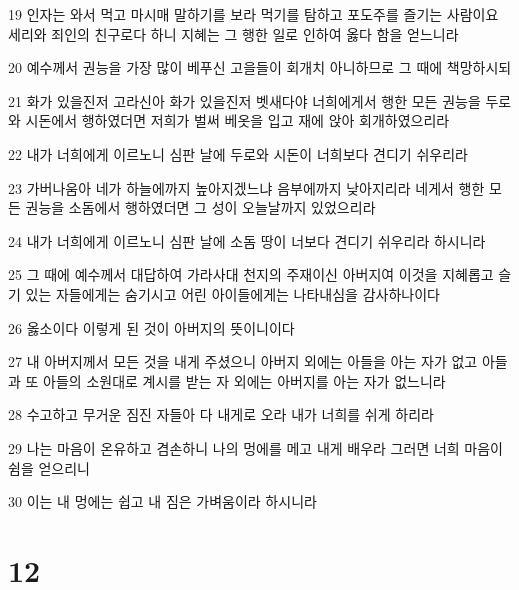 \par 19 인자는 와서 먹고 마시매 말하기를 보라 먹기를 탐하고 포도주를 즐기는 사람이요 세리와 죄인의 친구로다 하니 지혜는 그 행한 일로 인하여 옳다 함을 얻느니라
\par 20 예수께서 권능을 가장 많이 베푸신 고을들이 회개치 아니하므로 그 때에 책망하시되
\par 21 화가 있을진저 고라신아 화가 있을진저 벳새다야 너희에게서 행한 모든 권능을 두로와 시돈에서 행하였더면 저희가 벌써 베옷을 입고 재에 앉아 회개하였으리라
\par 22 내가 너희에게 이르노니 심판 날에 두로와 시돈이 너희보다 견디기 쉬우리라
\par 23 가버나움아 네가 하늘에까지 높아지겠느냐 음부에까지 낮아지리라 네게서 행한 모든 권능을 소돔에서 행하였더면 그 성이 오늘날까지 있었으리라
\par 24 내가 너희에게 이르노니 심판 날에 소돔 땅이 너보다 견디기 쉬우리라 하시니라
\par 25 그 때에 예수께서 대답하여 가라사대 천지의 주재이신 아버지여 이것을 지혜롭고 슬기 있는 자들에게는 숨기시고 어린 아이들에게는 나타내심을 감사하나이다
\par 26 옳소이다 이렇게 된 것이 아버지의 뜻이니이다
\par 27 내 아버지께서 모든 것을 내게 주셨으니 아버지 외에는 아들을 아는 자가 없고 아들과 또 아들의 소원대로 계시를 받는 자 외에는 아버지를 아는 자가 없느니라
\par 28 수고하고 무거운 짐진 자들아 다 내게로 오라 내가 너희를 쉬게 하리라
\par 29 나는 마음이 온유하고 겸손하니 나의 멍에를 메고 내게 배우라 그러면 너희 마음이 쉼을 얻으리니
\par 30 이는 내 멍에는 쉽고 내 짐은 가벼움이라 하시니라

\chapter{12}

